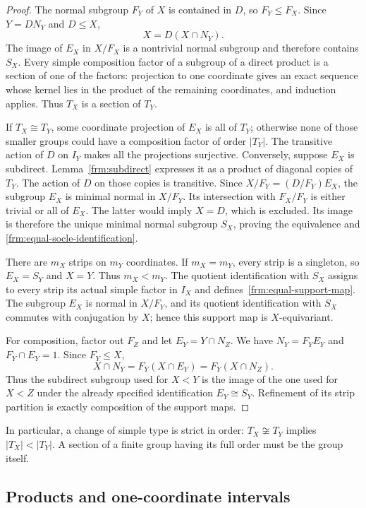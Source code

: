 \begin{proof}
The normal subgroup $F_Y$ of $X$ is contained in $D$, so $F_Y\le F_X$.
Since $Y=DN_Y$ and $D\le X$,
\[
 X=D(X\cap N_Y).
\]
The image of $E_X$ in $X/F_X$ is a nontrivial normal subgroup and
therefore contains $S_X$. Every simple composition factor of a subgroup
of a direct product is a section of one of the factors: projection to
one coordinate gives an exact sequence whose kernel lies in the product
of the remaining coordinates, and induction applies. Thus $T_X$ is a
section of $T_Y$.

If $T_X\cong T_Y$, some coordinate projection of $E_X$ is all of $T_Y$;
otherwise none of those smaller groups could have a composition factor
of order $|T_Y|$. The transitive action of $D$ on $I_Y$ makes all the
projections surjective. Conversely, suppose $E_X$ is subdirect.
Lemma~\ref{frm:subdirect} expresses it as a product of diagonal copies
of $T_Y$. The action of $D$ on those copies is transitive. Since
$X/F_Y=(D/F_Y)E_X$, the subgroup $E_X$ is minimal normal in $X/F_Y$.
Its intersection with $F_X/F_Y$ is either trivial or all of $E_X$.
The latter would imply $X=D$, which is excluded. Its image is therefore
the unique minimal normal subgroup $S_X$, proving the equivalence and
\eqref{frm:equal-socle-identification}.

There are $m_X$ strips on $m_Y$ coordinates. If $m_X=m_Y$, every strip
is a singleton, so $E_X=S_Y$ and $X=Y$. Thus $m_X<m_Y$.
The quotient identification with $S_X$ assigns to every strip its
actual simple factor in $I_X$ and defines~\eqref{frm:equal-support-map}.
The subgroup $E_X$ is normal in $X/F_Y$, and its quotient identification
with $S_X$ commutes with conjugation by $X$; hence this support map is
$X$-equivariant.

For composition, factor out $F_Z$ and let $E_Y=Y\cap N_Z$.
We have $N_Y=F_YE_Y$ and $F_Y\cap E_Y=1$. Since $F_Y\le X$,
\[
 X\cap N_Y=F_Y(X\cap E_Y)=F_Y(X\cap N_Z).
\]
Thus the subdirect subgroup used for $X<Y$ is the image of the one
used for $X<Z$ under the already specified identification
$E_Y\cong S_Y$. Refinement of its strip partition is exactly
composition of the support maps.
\end{proof}

In particular, a change of simple type is strict in order:
$T_X\not\cong T_Y$ implies $|T_X|<|T_Y|$. A section of a finite group
having its full order must be the group itself.

\subsection{Products and one-coordinate intervals}

